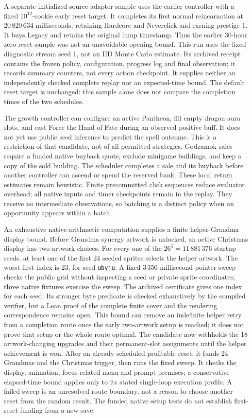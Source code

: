 \documentclass[11pt,a4paper]{article}
\numberwithin{equation}{section}
\theoremstyle{definition}
\theoremstyle{remark}
\begin{document}
A separate initialized source-adapter sample uses the earlier controller with a fixed $10^{12}$-cookie early reset target. It completes its first normal reincarnation at 20\,820\,634 milliseconds, retaining Hardcore and Neverclick and earning prestige 1. It buys Legacy and retains the original lump timestamp. Thus the earlier 30-hour zero-reset sample was not an unavoidable opening bound. This run uses the fixed diagnostic stream seed 1, not an IID Monte Carlo estimate. Its archived receipt contains the frozen policy, configuration, progress log and final observation; it records summary counters, not every action checkpoint. It supplies neither an independently checked complete replay nor an expected-time bound. The default reset target is unchanged: this sample alone does not compare the completion times of the two schedules.

The growth controller can configure an active Pantheon, fill empty dragon aura slots, and cast Force the Hand of Fate during an observed positive buff. It does not yet use public seed inference to predict the spell outcome. This is a restriction of that candidate, not of all permitted strategies. Godzamok sales require a funded native buyback quote, exclude minigame buildings, and keep a copy of the sold building. The scheduler completes a sale and its buyback before another controller can ascend or spend the reserved bank. These local return estimates remain heuristic. Finite precommitted click sequences reduce evaluator overhead; all native inputs and timer checkpoints remain in the replay. They receive no intermediate observations, so batching is a distinct policy when an opportunity appears within a batch.

An exhaustive native-arithmetic computation supplies a finite helper-Grandma display bound. Before Grandma synergy artwork is unlocked, an active Christmas display has two artwork choices. For every one of the $26^5=11\,881\,376$ startup seeds, at least one of the first 24 seeded sprites selects the helper artwork. The worst first index is 23, for seed \texttt{ubyju}. A fixed 3\,350-millisecond pointer sweep checks the public grid without inspecting a seed or private sprite coordinates; three native fixtures exercise the sweep. The archived certificate gives one index for each seed. Its stronger byte predicate is checked exhaustively by the compiled verifier, but a Lean proof of the complete finite cover and the rendering correspondence remains open. This bound can remove an indefinite helper retry from a completion route once the early two-artwork setup is reached; it does not prove that setup or the whole route optimal. The candidate now withholds the 18 artwork-changing upgrades and their permanent-slot assignments until the helper achievement is won. After an already scheduled profitable reset, it funds 24 Grandmas and the Christmas trigger, then runs the fixed sweep. It checks the display, animation, focus-related menu and prompt premises; a conservative elapsed-time bound applies only to its stated single-loop execution profile. A failed sweep is an unresolved route boundary, not a reason to choose another reset from the random result. The funded native setup tests do not establish first-reset funding from a new save.
\end{document}
